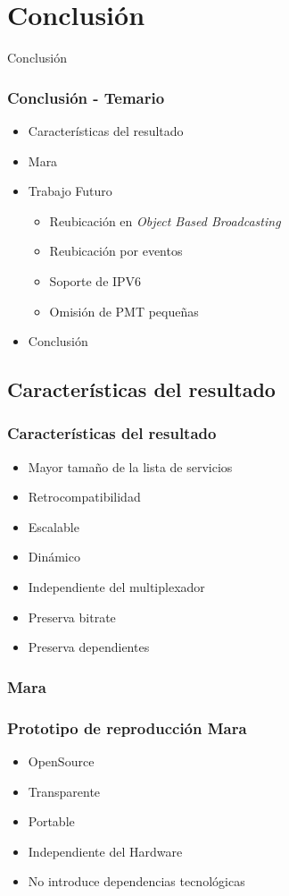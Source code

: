 \documentclass[a4paper,11pt]{beamer}
\begin{document}
\section{Conclusión}	

\begin{frame}

\begin{center}
\Huge Conclusión
\end{center}

\end{frame}

	\begin{frame}
		\frametitle{Conclusión - Temario}
		\begin{itemize}
		\item Características del resultado
		\item Mara
		\item Trabajo Futuro
		\begin{itemize}
			\item Reubicación en \emph{Object Based Broadcasting}
			\item Reubicación por eventos
			\item Soporte de IPV6
			\item Omisión de PMT pequeñas
		\end{itemize}
		\item Conclusión
	\end{itemize}
	\end{frame}
	\subsection{Características del resultado}
	\begin{frame}
		\frametitle{Características del resultado}
		\begin{itemize}
		\item Mayor tamaño de la lista de servicios
		\item Retrocompatibilidad
		\item Escalable
		\item Dinámico
		\item Independiente del multiplexador
		\item Preserva bitrate
		\item Preserva dependientes
		\end{itemize}
	\end{frame}

		\subsubsection{Mara}
		\begin{frame}
			\frametitle{Prototipo de reproducción Mara}
			\begin{itemize}
			\item OpenSource
			\item Transparente
			\item Portable
			\item Independiente del Hardware
			\item No introduce dependencias tecnológicas
			\end{itemize}
		\end{frame}
	
\end{document}
